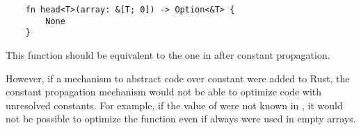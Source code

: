 \begin{listing}
    \begin{verbatim}
    fn head<T>(array: &[T; 0]) -> Option<&T> {
        None
    }
    \end{verbatim}
    \caption{This function should be equivalent to the one in  after constant propagation.}
    \label{lst:optimized}
\end{listing}

However, if a mechanism to abstract code over constant were added to Rust, the
constant propagation mechanism would not be able to optimize code with
unresolved constants. For example, if the value of  were not known in
, it would not be possible to optimize the
 function even if always were used in empty arrays.
